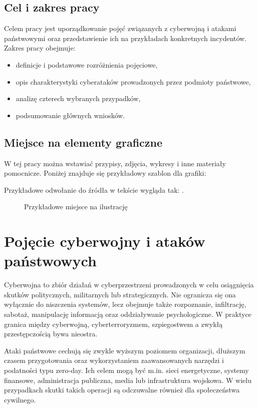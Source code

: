 \documentclass[12pt,a4paper]{article}
\begin{document}
\subsection{Cel i zakres pracy}
Celem pracy jest uporządkowanie pojęć związanych z cyberwojną i atakami państwowymi oraz przedstawienie ich na przykładach konkretnych incydentów. Zakres pracy obejmuje:
\begin{itemize}[leftmargin=1.5cm]
    \item definicje i podstawowe rozróżnienia pojęciowe,
    \item opis charakterystyki cyberataków prowadzonych przez podmioty państwowe,
    \item analizę czterech wybranych przypadków,
    \item podsumowanie głównych wniosków.
\end{itemize}

\subsection{Miejsce na elementy graficzne}
W tej pracy można wstawiać przypisy, zdjęcia, wykresy i inne materiały pomocnicze. Poniżej znajduje się przykładowy szablon dla grafiki:

Przykładowe odwołanie do źródła w tekście wygląda tak: \cite{bib:delaherche2012}.

\begin{figure}[H]
    \centering
    \caption{Przykładowe miejsce na ilustrację}
    \label{fig:placeholder}
\end{figure}

\section{Pojęcie cyberwojny i ataków państwowych}
Cyberwojna to zbiór działań w cyberprzestrzeni prowadzonych w celu osiągnięcia skutków politycznych, militarnych lub strategicznych. Nie ogranicza się ona wyłącznie do niszczenia systemów, lecz obejmuje także rozpoznanie, infiltrację, sabotaż, manipulację informacją oraz oddziaływanie psychologiczne. W praktyce granica między cyberwojną, cyberterroryzmem, szpiegostwem a zwykłą przestępczością bywa nieostra.

Ataki państwowe cechują się zwykle wyższym poziomem organizacji, dłuższym czasem przygotowania oraz wykorzystaniem zaawansowanych narzędzi i podatności typu zero-day. Ich celem mogą być m.in. sieci energetyczne, systemy finansowe, administracja publiczna, media lub infrastruktura wojskowa. W wielu przypadkach skutki takich operacji są odczuwalne również dla społeczeństwa cywilnego.
\end{document}
